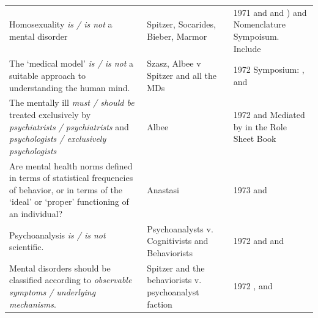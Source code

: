 \begin{refsection}
\begin{longtable}[!t]{ | P{4cm} | P{3cm} |  P{10cm} | }
&& \\ \hline \hline
Homosexuality \emph{is / is not} a mental disorder&Spitzer, Socarides, Bieber, Marmor& 1971   and      and ) \newline
  and  \newline
{}  Nomenclature Sympoisum. Include  \\ \hline
The ‘medical model’ \emph{is / is not} a suitable approach to understanding the human mind.&Szasz, Albee v Spitzer and all the MDs&1972 Symposium: ,  and  \newline
\\ \hline
The mentally ill \emph{must / should be} treated exclusively by \emph{psychiatrists / psychiatrists} and \emph{psychologists / exclusively psychologists} &Albee&1972  and  \newline Mediated by  in the Role Sheet Book \newline
 \\ \hline
Are mental health norms defined in terms of statistical frequencies of behavior, or in terms of the ‘ideal’ or ‘proper’ functioning of an individual?& Anastasi&1973  and  \newline \\ \hline
Psychoanalysis \emph{is / is not} scientific.&Psychoanalysts v. Cognitivists and Behaviorists&1972  and   and  \newline
 \\ \hline
Mental disorders should be classified according to \emph{observable symptoms / underlying mechanisms}.&Spitzer and the behaviorists v. psychoanalyst faction&1972 ,  and  \\ \hline

\end{longtable}
\end{refsection}
